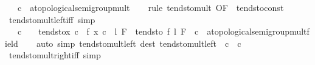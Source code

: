 \begin{isabellebody}
\ \ \ c\ {\isacharcolon}{\kern0pt}{\isacharcolon}{\kern0pt}\ {\isachardoublequoteopen}{\isacharprime}{\kern0pt}a{\isacharcolon}{\kern0pt}{\isacharcolon}{\kern0pt}topological{\isacharunderscore}{\kern0pt}semigroup{\isacharunderscore}{\kern0pt}mult{\isachardoublequoteclose}\isanewline
%
\isadelimproof
\ \ %
\endisadelimproof
%
\isatagproof
{}\isamarkupfalse%
\ {\isacharparenleft}{\kern0pt}rule\ tendsto{\isacharunderscore}{\kern0pt}mult\ {\isacharbrackleft}{\kern0pt}OF\ {\isacharunderscore}{\kern0pt}\ tendsto{\isacharunderscore}{\kern0pt}const{\isacharbrackright}{\kern0pt}{\isacharparenright}{\kern0pt}%
\endisatagproof
{\isafoldproof}%
%
\isadelimproof
\isanewline
%
\endisadelimproof
\isanewline
{}\isamarkupfalse%
\ tendsto{\isacharunderscore}{\kern0pt}mult{\isacharunderscore}{\kern0pt}left{\isacharunderscore}{\kern0pt}iff\ {\isacharbrackleft}{\kern0pt}simp{\isacharbrackright}{\kern0pt}{\isacharcolon}{\kern0pt}\isanewline
\ \ \ {\isachardoublequoteopen}c\ {\isasymnoteq}\ {}\ {\isasymLongrightarrow}\ tendsto{\isacharparenleft}{\kern0pt}{\isasymlambda}x{\isachardot}{\kern0pt}\ c\ {\isacharasterisk}{\kern0pt}\ f\ x{\isacharparenright}{\kern0pt}\ {\isacharparenleft}{\kern0pt}c\ {\isacharasterisk}{\kern0pt}\ l{\isacharparenright}{\kern0pt}\ F\ {\isasymlongleftrightarrow}\ tendsto\ f\ l\ F{\isachardoublequoteclose}\ \ c\ {\isacharcolon}{\kern0pt}{\isacharcolon}{\kern0pt}\ {\isachardoublequoteopen}{\isacharprime}{\kern0pt}a{\isacharcolon}{\kern0pt}{\isacharcolon}{\kern0pt}{\isacharbraceleft}{\kern0pt}topological{\isacharunderscore}{\kern0pt}semigroup{\isacharunderscore}{\kern0pt}mult{\isacharcomma}{\kern0pt}field{\isacharbraceright}{\kern0pt}{\isachardoublequoteclose}\isanewline
%
\isadelimproof
\ \ %
\endisadelimproof
%
\isatagproof
{}\isamarkupfalse%
\ {\isacharparenleft}{\kern0pt}auto\ simp{\isacharcolon}{\kern0pt}\ tendsto{\isacharunderscore}{\kern0pt}mult{\isacharunderscore}{\kern0pt}left\ dest{\isacharcolon}{\kern0pt}\ tendsto{\isacharunderscore}{\kern0pt}mult{\isacharunderscore}{\kern0pt}left\ {\isacharbrackleft}{\kern0pt}\ c\ {\isacharequal}{\kern0pt}\ {\isachardoublequoteopen}{}{\isacharslash}{\kern0pt}c{\isachardoublequoteclose}{\isacharbrackright}{\kern0pt}{\isacharparenright}{\kern0pt}%
\endisatagproof
{\isafoldproof}%
%
\isadelimproof
\isanewline
%
\endisadelimproof
\isanewline
{}\isamarkupfalse%
\ tendsto{\isacharunderscore}{\kern0pt}mult{\isacharunderscore}{\kern0pt}right{\isacharunderscore}{\kern0pt}iff\ {\isacharbrackleft}{\kern0pt}simp{\isacharbrackright}{\kern0pt}{\isacharcolon}{\kern0pt}\isanewline

\end{isabellebody}
